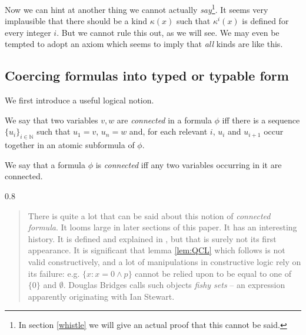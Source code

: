 \documentclass[12pt]{article}
\renewcommand{\smallpara}[1]{\begin{footnotesize}\begin{spacing}{0.8}\begin{quote} #1  \end{quote}\end{spacing}\end{footnotesize}}
\begin{document}
Now we can hint at another thing we cannot actually {\sl
  say}\footnote{In section \ref{whistle} we will give an actual proof
that this cannot be said.}.  It seems very implausible that there
should be a kind $\kappa(x)$ such that $\kappa^i(x)$ is defined for
every integer $i$.  But we cannot rule this out, as we will see.  We
may even be tempted to adopt an axiom which seems to imply that {\sl
  all} kinds are like this.

\subsection{Coercing formulas into typed or typable form}

We first introduce a useful logical notion.   



\begin{dfn} \mbox{\negthinspace}

  We say that two variables $v,w$ are {\em connected\/} in a formula $\phi$ iff there is a sequence $\{u_i\}_{i \in \mathbb N}$ such that  $u_1=v$, $u_n = w$ and, for each relevant $i$, $u_i$ and $u_{i+1}$ occur together in an atomic subformula of $\phi$.

  We say that a formula $\phi$ is {\em connected\/} iff any two
  variables occurring in it are connected.\end{dfn} \smallpara{There
  is quite a lot that can be said about this notion of {\sl connected
    formula}.  It looms large in later sections of this paper.  It has
  an interesting history.  It is defined and explained in \cite{Dz},
  but that is surely not its first appearance.  It is significant that
  lemma \ref{lem:QCL} which follows is not valid constructively, and a
  lot of manipulations in constructive logic rely on its failure:
  e.g. $\{x: x = 0 \wedge p\}$ cannot be relied upon to be equal to
  one of $\{0\}$ and $\emptyset$.  Douglas Bridges calls such objects
  {\sl fishy sets} -- an expression apparently originating with Ian
  Stewart. }
\end{document}
